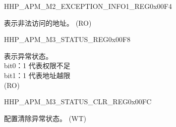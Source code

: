 \begin{register}{H}{HP\_APM\_M2\_EXCEPTION\_INFO1\_REG}{0x00F4}\label{regdesc:HPAPMM2EXCEPTIONINFO1REG}
%
\regnewline%
\begin{regdesc}\begin{reglist}
\label{fielddesc:HPAPMM2EXCEPTIONADDR}\item [HP\_APM\_M2\_EXCEPTION\_ADDR] 表示非法访问的地址。 (RO)
\end{reglist}\end{regdesc}
\end{register}


\begin{register}{H}{HP\_APM\_M3\_STATUS\_REG}{0x00F8}\label{regdesc:HPAPMM3STATUSREG}
%
%
\regnewline%
\begin{regdesc}\begin{reglist}
\label{fielddesc:HPAPMM3EXCEPTIONSTATUS}\item [HP\_APM\_M3\_EXCEPTION\_STATUS] 表示异常状态。 \\
bit0：1 代表权限不足 \\
bit1：1 代表地址越限  \\ (RO)
\end{reglist}\end{regdesc}
\end{register}


\begin{register}{H}{HP\_APM\_M3\_STATUS\_CLR\_REG}{0x00FC}\label{regdesc:HPAPMM3STATUSCLRREG}
%
%
\regnewline%
\begin{regdesc}\begin{reglist}
\label{fielddesc:HPAPMM3REGIONSTATUSCLR}\item [HP\_APM\_M3\_REGION\_STATUS\_CLR] 配置清除异常状态。 (WT)
\end{reglist}\end{regdesc}
\end{register}


